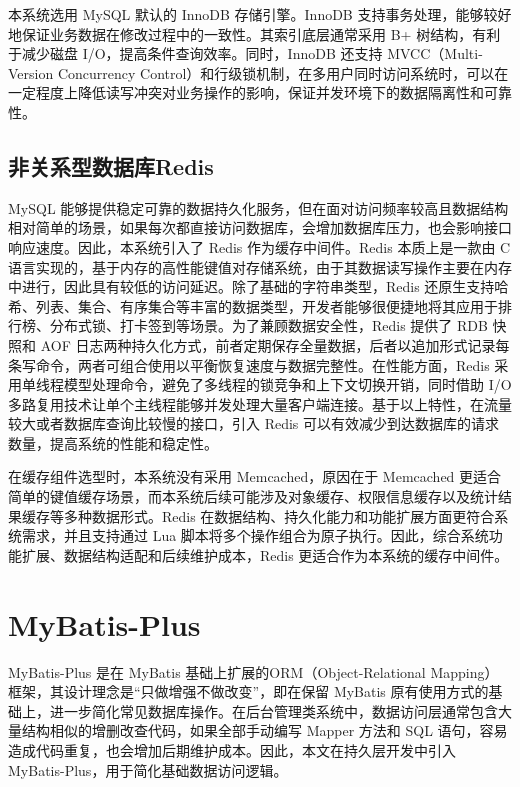 本系统选用 MySQL 默认的 InnoDB 存储引擎\cite{mysql2024innodb}。InnoDB 支持事务处理，能够较好地保证业务数据在修改过程中的一致性。其索引底层通常采用 B+ 树结构，有利于减少磁盘 I/O，提高条件查询效率。同时，InnoDB 还支持 MVCC\cite{mysql2024mvcc}（Multi-Version Concurrency Control）和行级锁机制，在多用户同时访问系统时，可以在一定程度上降低读写冲突对业务操作的影响，保证并发环境下的数据隔离性和可靠性。
\subsection{非关系型数据库Redis}
MySQL 能够提供稳定可靠的数据持久化服务，但在面对访问频率较高且数据结构相对简单的场景，如果每次都直接访问数据库，会增加数据库压力，也会影响接口响应速度。因此，本系统引入了 Redis 作为缓存中间件。Redis 本质上是一款由 C 语言实现的，基于内存的高性能键值对存储系统，由于其数据读写操作主要在内存中进行，因此具有较低的访问延迟。除了基础的字符串类型，Redis 还原生支持哈希、列表、集合、有序集合等丰富的数据类型，开发者能够很便捷地将其应用于排行榜、分布式锁、打卡签到等场景\cite{redis2025datatypes}。为了兼顾数据安全性，Redis 提供了 RDB 快照和 AOF 日志两种持久化方式，前者定期保存全量数据，后者以追加形式记录每条写命令，两者可组合使用以平衡恢复速度与数据完整性\cite{redis2025persistence}。在性能方面，Redis 采用单线程模型处理命令，避免了多线程的锁竞争和上下文切换开销，同时借助 I/O 多路复用技术让单个主线程能够并发处理大量客户端连接。基于以上特性，在流量较大或者数据库查询比较慢的接口，引入 Redis 可以有效减少到达数据库的请求数量，提高系统的性能和稳定性。

在缓存组件选型时，本系统没有采用 Memcached\cite{memcached2025userguide}，原因在于 Memcached 更适合简单的键值缓存场景，而本系统后续可能涉及对象缓存、权限信息缓存以及统计结果缓存等多种数据形式。Redis 在数据结构、持久化能力和功能扩展方面更符合系统需求，并且支持通过 Lua 脚本将多个操作组合为原子执行\cite{redis2025lua}。因此，综合系统功能扩展、数据结构适配和后续维护成本，Redis 更适合作为本系统的缓存中间件。

\section{MyBatis-Plus}

MyBatis-Plus\cite{baomidou2025} 是在 MyBatis 基础上扩展的ORM（Object-Relational Mapping）框架，其设计理念是“只做增强不做改变”，即在保留 MyBatis 原有使用方式的基础上，进一步简化常见数据库操作。在后台管理类系统中，数据访问层通常包含大量结构相似的增删改查代码，如果全部手动编写 Mapper 方法和 SQL 语句，容易造成代码重复，也会增加后期维护成本。因此，本文在持久层开发中引入 MyBatis-Plus，用于简化基础数据访问逻辑。

